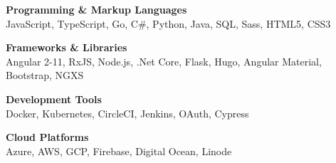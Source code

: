 

\begin{cvparagraph}

    \textbf{Programming \& Markup Languages}\\
    JavaScript, TypeScript, Go, C\#, Python, Java, SQL, Sass, HTML5, CSS3

    \textbf{Frameworks \& Libraries}\\
    Angular 2-11, RxJS, Node.js, .Net Core, Flask, Hugo, Angular Material, Bootstrap, NGXS

    \textbf{Development Tools}\\
    Docker, Kubernetes, CircleCI, Jenkins, OAuth, Cypress

    \textbf{Cloud Platforms}\\
    Azure, AWS, GCP, Firebase, Digital Ocean, Linode
\end{cvparagraph}
